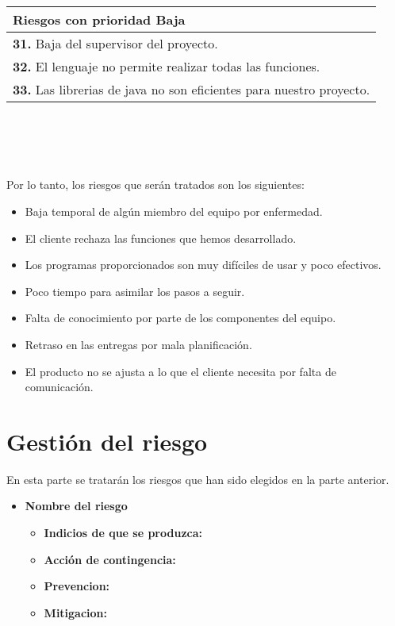 \documentclass[spanish,a4paper,12pt]{report}	%
\begin{document}
			\begin{tabular}{|p{12cm}|}
				\hline
				\textbf{Riesgos con prioridad Baja}\\ \hline \hline
				\textbf{31.} Baja del supervisor del proyecto.\\ \hline 
				\textbf{32.} El lenguaje no permite realizar todas las funciones.\\ \hline
				\textbf{33.} Las librerias de java no son eficientes para nuestro proyecto. \\ \hline
			\end{tabular}
			\ \\
			\ \\
			\ \\
			\ \\
			Por lo tanto, los riesgos que serán tratados son los siguientes:
			\begin{itemize}
			  \item Baja temporal de algún miembro del equipo por enfermedad.
			  \item El cliente rechaza las funciones que hemos desarrollado.
			  \item Los programas proporcionados son muy difíciles de usar y poco efectivos.
			  \item Poco tiempo para asimilar los pasos a seguir. 
			  \item Falta de conocimiento por parte de los componentes del equipo. 
			  \item Retraso en las entregas por mala planificación. 
			  \item El producto no se ajusta a lo que el cliente necesita por falta de comunicación. 
			\end{itemize}
			

\part{Gestión del riesgo}
	En esta parte se tratarán los riesgos que han sido elegidos en la parte anterior.
	\begin{itemize}
	\item \textbf{Nombre del riesgo}			%
		\begin{itemize}
			\item \textbf {Indicios de que se produzca: }
			\item \textbf {Acción de contingencia: }
			\item \textbf {Prevencion: }
			\item \textbf {Mitigacion: }
		\end{itemize}
	\end{itemize}
	
\end{document}
